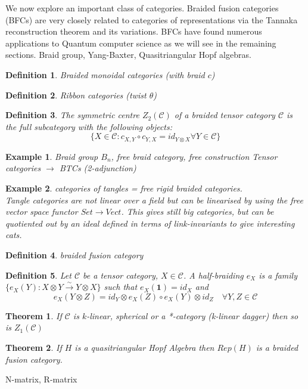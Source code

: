\documentclass{article}
\newtheorem{definition}{Definition}
\newtheorem{example}{Example}
\newtheorem{theorem}{Theorem}
\begin{document}
	We now explore an important class of categories. Braided fusion categories (BFCs) are very closely related to categories of representations via the Tannaka reconstruction theorem and its variations. BFCs have found numerous applications to Quantum computer science as we will see in the remaining sections.
	Braid group, Yang-Baxter, Quasitriangular Hopf algebras.
	\begin{definition}
		Braided monoidal categories (with braid $c$)
	\end{definition}
	\begin{definition}
		Ribbon categories (twist $\theta$)
	\end{definition}
	\begin{definition}
		The symmetric centre $Z_2(\mathcal{C})$ of a braided tensor category $\mathcal{C}$ is the full subcategory with the following objects:
		$$ \{ X \in \mathcal{C} : c_{X,Y} \circ c_{Y,X} = id_{Y\otimes X} \forall Y \in \mathcal{C} \} $$
	\end{definition}
	
	\begin{example}
		Braid group $B_n$, free braid category, free construction Tensor categories $\rightarrow$ BTCs (2-adjunction)
	\end{example}
	\begin{example}
		categories of tangles = free rigid braided categories.\\
		Tangle categories are not linear over a field but can be linearised by using the free vector space functor $Set \rightarrow Vect$. This gives still big categories, but can be quotiented out by an ideal defined in terms of link-invariants to give interesting cats.
	\end{example}
	\begin{definition}
		braided fusion category
	\end{definition}
	\begin{definition}
		Let $\mathcal{C}$ be a tensor category, $X \in \mathcal{C}$. A half-braiding $e_X$ is a family $\{ e_X(Y):X\otimes Y \xrightarrow{\sim} Y\otimes X \}$ such that $e_X(\mathbf{1}) = id_X$ and 
		\begin{equation*}
		e_X(Y\otimes Z) = id_Y\otimes e_X(Z) \circ e_X(Y) \otimes id_Z \quad \forall Y,Z \in \mathcal{C}
		\end{equation*}
	\end{definition}
	
	\begin{theorem}
		If $\mathcal{C}$ is $k$-linear, spherical or a *-category (k-linear dagger) then so is $Z_1(\mathcal{C})$ 
	\end{theorem}
	\begin{theorem}
		If $H$ is a quasitriangular Hopf Algebra then $Rep(H)$ is a braided fusion category.
	\end{theorem}
	
	N-matrix, R-matrix
\end{document}
